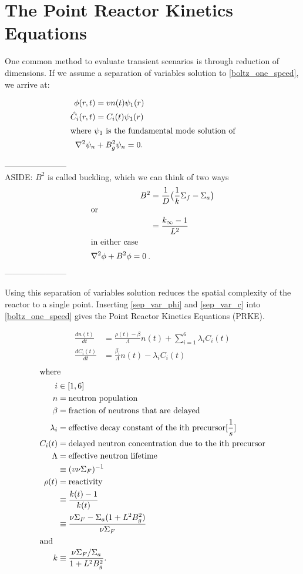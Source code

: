\documentclass[12pt]{article}
\begin{document}
\section{The Point Reactor Kinetics Equations}

One common method to evaluate transient scenarios is through reduction of 
dimensions. If we assume a separation of variables solution  to 
\eqref{boltz_one_speed}, we arrive at:

\begin{align}
  \phi(r,t) &= vn(t)\psi_1(r) \label{sep_var_phi}\\
  \hat{C}_i(r,t) &= C_i(t)\psi_1(r) \label{sep_var_c}\\
  \intertext{where $\psi_1$ is the fundamental mode solution of}
  \nabla^2\psi_n &+ B_g^2\psi_n = 0.
\end{align}

-----------------------\\
ASIDE: $B^2$ is called buckling, which we can think of two ways \cite{lamarsh_introduction_2001}
\begin{align*}
B^2 &= \frac{1}{D}\bigl( \frac{1}{k}\Sigma_f - \Sigma_a \bigr) \\
\intertext{or}
&= \frac{k_{\infty} - 1}{L^2}\\
\intertext{in either case}
\nabla^2 \phi + B^2\phi = 0\:.
\end{align*} 
-----------------------

Using this separation of variables solution reduces the spatial complexity of
the reactor to a single point. Inserting \eqref{sep_var_phi} and
\eqref{sep_var_c} into \eqref{boltz_one_speed} gives the Point Reactor Kinetics Equations (PRKE).

\begin{align}
  \frac{dn(t)}{dt} &= \frac{\rho(t)-\beta}{\Lambda}n(t) + \sum_{i=1}^{6}\lambda_iC_i(t)\\
  \frac{dC_i(t)}{dt} &= \frac{\beta_i}{\Lambda}n(t) - \lambda_i C_i(t)
  \label{prke}
 \end{align}
 \begin{align*}
  \intertext{where}
  i&\in[1,6]\nonumber\\
  n &= \mbox{neutron population}\\
  \beta &= \mbox{fraction of neutrons that are delayed}\\
  \lambda_i &= \mbox{effective decay constant of the ith precursor}[\frac{1}{s}]\\
  C_i(t) &= \mbox{delayed neutron concentration due to the ith precursor}\\
  \Lambda &= \mbox{effective neutron lifetime}\\
  &\equiv (v\nu\Sigma_F)^{-1}\nonumber\\
  \rho(t) &= \mbox{reactivity}\\
  &\equiv\frac{k(t)-1}{k(t)}\nonumber\\
         &\equiv\frac{\nu\Sigma_F-\Sigma_a(1+L^2B_g^2)}{\nu\Sigma_F}\nonumber\\
  \intertext{and}
  k&\equiv \frac{\nu\Sigma_F/\Sigma_a}{1+L^2B_g^2}.\nonumber
\end{align*}
\end{document}
